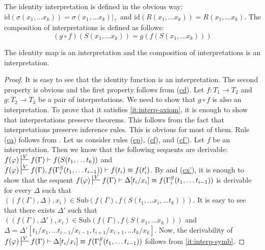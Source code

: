 \documentclass[reqno]{amsart}
\newcommand{\axref}[1]{(\hyperref[ax:#1]{#1})}
\theoremstyle{definition}
\theoremstyle{remark}
\newcommand{\fs}[1]{\mathrm{#1}}
\newcommand{\sub}{\fs{Sub}}
\newcommand{\id}{\fs{id}}
\numberwithin{figure}{section}
\begin{document}
The identity interpretation is defined in the obvious way: $\id(\sigma(x_1, \ldots x_k)) = \sigma(x_1, \ldots x_k)|_\top$ and $\id(R(x_1, \ldots x_k)) = R(x_1, \ldots x_k)$.
The composition of interpretations is defined as follows:
\[ (g \circ f)(S(x_1, \ldots x_k)) = g(f(S(x_1, \ldots x_k))) \]

\begin{lem}
The identity map is an interpretation and the composition of interpretations is an interpretation.
\end{lem}
\begin{proof}
It is easy to see that the identity function is an interpretation.
The second property is obvious and the first property follows from \axref{cd}.
Let $f : T_1 \to T_2$ and $g : T_2 \to T_3$ be a pair of interpretations.
We need to show that $g \circ f$ is also an interpretation.
To prove that it satisfies \eqref{it:interp-axiom}, it is enough to show that interpretations preserve theorems.
This follows from the fact that interpretations preserve inference rules.
This is obvious for most of them.
Rule \axref{ca} follows from .
Let us consider rules \axref{cp}, \axref{cf}, and \axref{cf'}.
Let $f$ be an interpretation.
Then we know that the following sequents are derivable: $f(\varphi) \sststile{}{V} f(\Gamma) \vdash f(S(t_1, \ldots t_k))$ and $f(\varphi) \sststile{}{V} f(\Gamma), f(\Gamma_i^S(t_1, \ldots t_{i-1})) \vdash f(t_i) \equiv f(t_i')$.
By  and \axref{cx'}, it is enough to show that the sequent $f(\varphi) \sststile{}{V} f(\Gamma) \vdash \Delta[t_i/x_i] \equiv f(\Gamma_i^S(t_1, \ldots t_{i-1}))$ is derivable for every $\Delta$ such that $((f(\Gamma),\Delta),x_i) \in \sub(f(\Gamma), f(S(t_1, \ldots x_i, \ldots t_k)))$.
It is easy to see that there exists $\Delta'$ such that $((f(\Gamma),\Delta'),x_i) \in \sub(f(\Gamma), f(S(x_1, \ldots x_k)))$ and $\Delta = \Delta'[t_1/x_1, \ldots t_{i-1}/x_{i-1}, t_{i+1}/x_{i+1}, \ldots t_k/x_k]$.
Now, the derivability of $f(\varphi) \sststile{}{V} f(\Gamma) \vdash \Delta[t_i/x_i] \equiv f(\Gamma_i^S(t_1, \ldots t_{i-1}))$ follows from \eqref{it:interp-symb}.


\end{proof}
\end{document}
